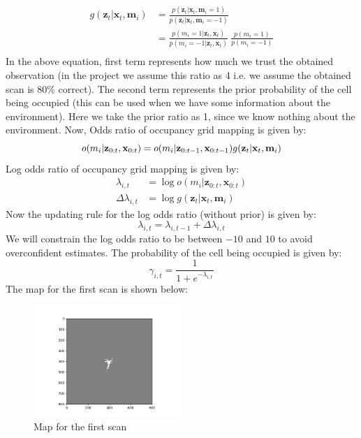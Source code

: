 \documentclass[a4paper]{article}
\begin{document}
\begin{equation}
\begin{aligned}
    g(\mathbf{z}_{t} | \mathbf{x}_{t}, \mathbf{m}_i) &= \frac{p(\mathbf{z}_{t} | \mathbf{x}_{t}, \mathbf{m}_i = 1)}{p(\mathbf{z}_{t} | \mathbf{x}_{t}, \mathbf{m}_i = -1)} \\
    &= \frac{p(m_i = 1 | \mathbf{z}_t, \mathbf{x}_t)}{p(m_i = -1 | \mathbf{z}_t, \mathbf{x}_t)} \ \frac{p(m_i = 1)}{p(m_i = -1)} \\
\end{aligned}
\end{equation}
In the above equation, first term represents how much we trust the obtained observation (in the project we assume this ratio as 4 i.e. we assume the obtained scan is 80\% correct). The second term represents the prior probability of the cell being occupied (this can be used when we have some information about the environment). Here we take the prior ratio as 1, since we know nothing about the environment. Now, Odds ratio of occupancy grid mapping is given by:
\begin{equation}
    o(m_i | \mathbf{z}_{0:t}, \mathbf{x}_{0:t}) = o(m_i | \mathbf{z}_{0:t-1}, \mathbf{x}_{0:t-1}) g(\mathbf{z}_{t} | \mathbf{x}_{t}, \mathbf{m}_i) \\
\end{equation}
Log odds ratio of occupancy grid mapping is given by:
\begin{equation}
    \begin{aligned}
        \lambda_{i,t} &= \log o(m_i | \mathbf{z}_{0:t}, \mathbf{x}_{0:t}) \\
    \Delta \lambda_{i,t} &= \log g(\mathbf{z}_{t} | \mathbf{x}_{t}, \mathbf{m}_i)
    \end{aligned}
\end{equation}
Now the updating rule for the log odds ratio (without prior) is given by:
\begin{equation}
    \lambda_{i,t} = \lambda_{i,t-1} + \Delta \lambda_{i,t}
\end{equation}
We will constrain the log odds ratio to be between $-10$ and $10$ to avoid overconfident estimates. The probability of the cell being occupied is given by:
\begin{equation}
    \gamma_{i,t} = \frac{1}{1 + e^{-\lambda_{i,t}}}
\end{equation}
The map for the first scan is shown below:

\begin{figure}[h]
    \centering
    \includegraphics[width=0.5\textwidth]{first_scan.png}
    \caption{Map for the first scan}
    \label{fig:map1}
\end{figure}
\end{document}

